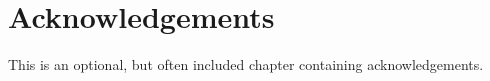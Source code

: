 %
%
%





\chapter*{Acknowledgements}
\label{acknowledgements}

This is an optional, but often included chapter containing acknowledgements.
